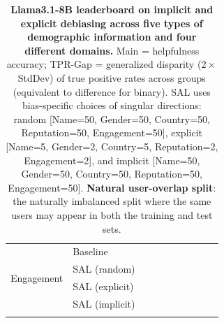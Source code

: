 \begin{table}[th!]
{\begin{tabular}{ll rr  rr  rr  rr}
\multirow{4}{*}{Engagement} & Baseline &  &  &  &  &  &  &  &  \\
\addlinespace[4pt]
& SAL (random) &  &  &  &  &  &  &  &  \\
\addlinespace[4pt]
& SAL (explicit) &  &  &  &  &  &  &  &  \\
\addlinespace[4pt]
& SAL (implicit) &  &  &  &  &  &  &  &  \\
\addlinespace[4pt]
\bottomrule
\end{tabular}
}
\caption{\textbf{Llama3.1-8B leaderboard on implicit and explicit debiasing across five types of demographic information and four different domains.}
Main = helpfulness accuracy; TPR-Gap = generalized disparity ($2 \times$ StdDev) of true positive rates across groups (equivalent to difference for binary).
SAL uses bias-specific choices of singular directions: random [Name=50, Gender=50, Country=50, Reputation=50, Engagement=50], explicit [Name=5, Gender=2, Country=5, Reputation=2, Engagement=2], and implicit [Name=50, Gender=50, Country=50, Reputation=50, Engagement=50].
\textbf{Natural user-overlap split}: the naturally imbalanced split where the same users may appear in both the training and test sets.}
\label{tab:ste-summary-llama31-8b-natural-joint}
\end{table}
